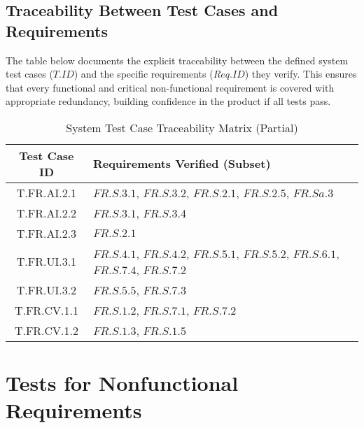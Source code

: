 \documentclass[12pt, titlepage]{article}
\begin{document}
\subsection{Traceability Between Test Cases and Requirements}

The table below documents the explicit traceability between the defined system test cases ($\mathit{T.ID}$) and the specific requirements ($\mathit{Req.ID}$) they verify. This ensures that every functional and critical non-functional requirement is covered with appropriate redundancy, building confidence in the product if all tests pass.

\begin{table}[h!]
    \centering
    \caption{System Test Case Traceability Matrix (Partial)}
    \label{tab:system-test-traceability}
    \begin{tabularx}{\textwidth}{|c|X|}
    \hline
    \textbf{Test Case ID} & \textbf{Requirements Verified (Subset)} \\
    \hline
    T.FR.AI.2.1 & $\hyperref[FR.S.3.1]{FR.S.3.1}$, $\hyperref[FR.S.3.2]{FR.S.3.2}$, $\hyperref[FR.S.2.1]{FR.S.2.1}$, $\hyperref[FR.S.2.5]{FR.S.2.5}$, $\hyperref[FR.Sa.3]{FR.Sa.3}$ \\
    \hline
    T.FR.AI.2.2 & $\hyperref[FR.S.3.1]{FR.S.3.1}$, $\hyperref[FR.S.3.4]{FR.S.3.4}$ \\
    \hline
    T.FR.AI.2.3 & $\hyperref[FR.S.2.1]{FR.S.2.1}$ \\
    \hline
    T.FR.UI.3.1 & $\hyperref[FR.S.4.1]{FR.S.4.1}$, $\hyperref[FR.S.4.2]{FR.S.4.2}$, $\hyperref[FR.S.5.1]{FR.S.5.1}$, $\hyperref[FR.S.5.2]{FR.S.5.2}$, $\hyperref[FR.S.6.1]{FR.S.6.1}$, $\hyperref[FR.S.7.4]{FR.S.7.4}$, $\hyperref[FR.S.7.2]{FR.S.7.2}$ \\
    \hline
    T.FR.UI.3.2 & $\hyperref[FR.S.5.5]{FR.S.5.5}$, $\hyperref[FR.S.7.3]{FR.S.7.3}$ \\
    \hline
    T.FR.CV.1.1 & $\hyperref[FR.S.1.2]{FR.S.1.2}$, $\hyperref[FR.S.7.1]{FR.S.7.1}$, $\hyperref[FR.S.7.2]{FR.S.7.2}$ \\
    \hline
    T.FR.CV.1.2 & $\hyperref[FR.S.1.3]{FR.S.1.3}$, $\hyperref[FR.S.1.5]{FR.S.1.5}$ \\
    \end{tabularx}
\end{table}

\section{Tests for Nonfunctional Requirements}
\end{document}
